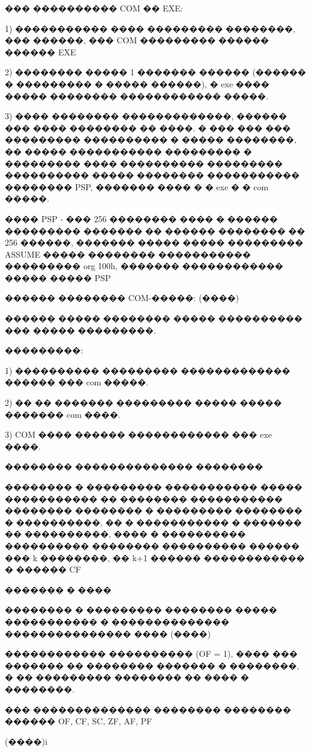 ��� ���������� COM �� EXE:

1) ����������� ���� ��������� ��������, ��� ������, ��� COM ��������� ������ ������ EXE

2) �������� ����� 1 ������� ������ (������ � ��������� � ����� ������), � exe ���� ����� ��������
������������ �����.

3) ���� �������� �������������, ������ ��� ���� �������� �� ����. � ��� ��� ��� ���������
���������� � ����� ��������, �� ����� ����������� ��������� � ��������� ���� ���������� ���������
���������� ����� �������� ����������� �������� PSP, ������� ���� � � exe � � com �����.

���� PSP - ��� 256 �������� ���� � ������ ��������� ������� �� ������ �������� �� 256 ������, �������
����� ����� ��������� ASSUME ����� �������� ����������� ��������� org 100h, ������� ������������
����� ����� PSP

������ �������� COM-�����: (����)

������ ����� �������� ����� ���������� ��� ����� ���������.

���������:

1) ���������� ��������� ������������� ������ ��� com �����.

2) �� �� ������� ��������� ����� ����� ������� com ����.

3) COM ���� ������ ������������ ��� exe ����.

�������� �������������� ��������

�������� � ��������� ����������� ����� ����������� �� �������� ����������� �������� �������� �
��������� ��������  � ����������, �� � ����������� � ������� �� ����������, ���� � ����������
���������� �������� ���������� ������ ��� k ��������, �� k+1 ������ ������������ � ������ CF

������� � ����

�������� � ��������� �������� ����� ����������� � �������������� ��������������� ���� 
(����)

������������ ���������� (OF = 1), ���� ��� ������� �� �������� ������� � ��������, � �� ���������
�������� �� ���� � ��������.

��� �������������� �������� �������� ������ OF, CF, SC, ZF, AF, PF

(����)i